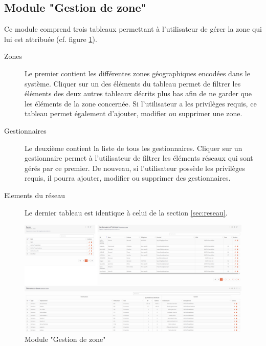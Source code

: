 \documentclass{EPL-master-thesis-covers-FR}
\begin{document}
				
			\subsection*{Module "Gestion de zone"}
				Ce module comprend trois tableaux permettant à l'utilisateur de gérer la zone qui lui est attribuée (cf. figure \ref{fig:zone}).
				\begin{description}
					\item[Zones] Le premier contient les différentes zones géographiques encodées dans le système. Cliquer sur un des éléments du tableau permet de filtrer les éléments des deux autres tableaux décrits plus bas afin de ne garder que les éléments de la zone concernée. Si l'utilisateur a les privilèges requis, ce tableau permet également d'ajouter, modifier ou supprimer une zone.
					\item[Gestionnaires] Le deuxième contient la liste de tous les gestionnaires. Cliquer sur un gestionnaire permet à l'utilisateur de filtrer les éléments réseaux qui sont gérés par ce premier. De nouveau, si l'utilisateur possède les privilèges requis, il pourra ajouter, modifier ou supprimer des gestionnaires.
					\item [Elements du réseau] Le dernier tableau est identique à celui de la section \ref{sec:reseau}.
				\end{description}
				
				\begin{figure}[H]
					\centering
					\includegraphics[width=1\textwidth]{images/gestion}
					\caption{Module "Gestion de zone"}
					\label{fig:zone}
				\end{figure}
			
\end{document}
